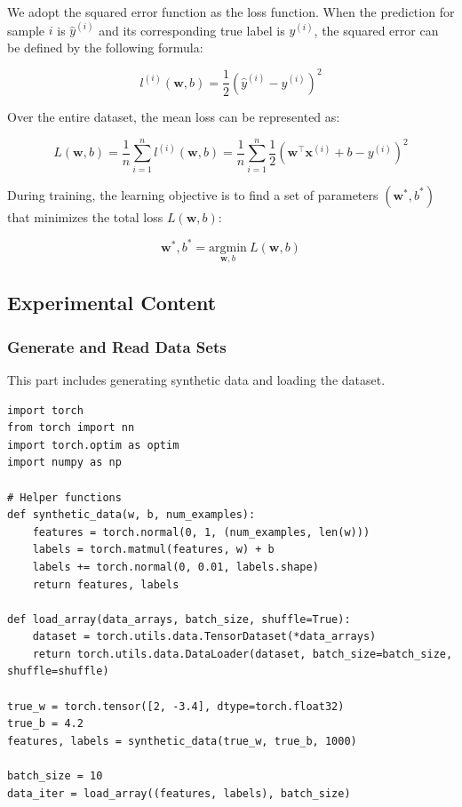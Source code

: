 \documentclass[a4paper,12pt]{article}
\begin{document}
We adopt the squared error function as the loss function. When the prediction for sample \( i \) is \( \hat{y}^{(i)} \) and its corresponding true label is \( y^{(i)} \), the squared error can be defined by the following formula:

\begin{equation}
l^{(i)}(\mathbf{w}, b) = \frac{1}{2} \left( \hat{y}^{(i)} - y^{(i)} \right)^2
\end{equation}

Over the entire dataset, the mean loss can be represented as:

\begin{equation}
L(\mathbf{w}, b) = \frac{1}{n} \sum_{i=1}^{n} l^{(i)}(\mathbf{w}, b) = \frac{1}{n} \sum_{i=1}^{n} \frac{1}{2} \left( \mathbf{w}^\top \mathbf{x}^{(i)} + b - y^{(i)} \right)^2
\end{equation}

During training, the learning objective is to find a set of parameters \( (\mathbf{w}^*, b^*) \) that minimizes the total loss \( L(\mathbf{w}, b) \):

\begin{equation}
\mathbf{w}^*, b^* = \underset{\mathbf{w}, b}{\mathrm{argmin}} \ L(\mathbf{w}, b)
\end{equation}

\subsection{Experimental Content}
\subsubsection{Generate and Read Data Sets}
This part includes generating synthetic data and loading the dataset.
\begin{lstlisting}
import torch
from torch import nn
import torch.optim as optim
import numpy as np

# Helper functions
def synthetic_data(w, b, num_examples):
    features = torch.normal(0, 1, (num_examples, len(w)))
    labels = torch.matmul(features, w) + b
    labels += torch.normal(0, 0.01, labels.shape)
    return features, labels

def load_array(data_arrays, batch_size, shuffle=True):
    dataset = torch.utils.data.TensorDataset(*data_arrays)
    return torch.utils.data.DataLoader(dataset, batch_size=batch_size, shuffle=shuffle)

true_w = torch.tensor([2, -3.4], dtype=torch.float32)
true_b = 4.2
features, labels = synthetic_data(true_w, true_b, 1000)

batch_size = 10
data_iter = load_array((features, labels), batch_size)
\end{lstlisting}
\end{document}
